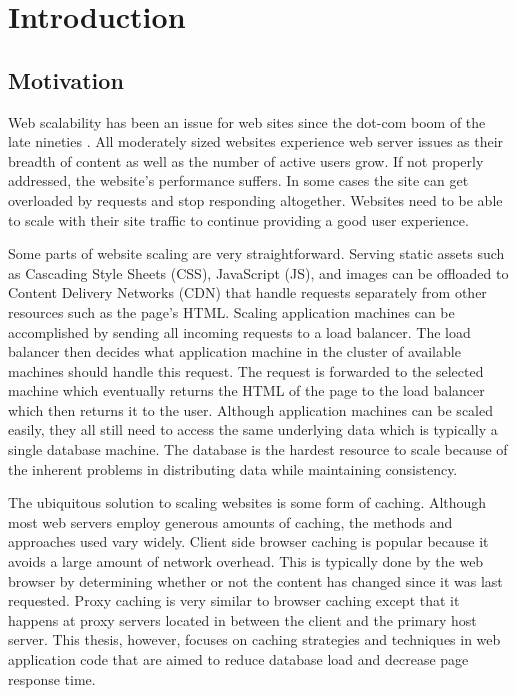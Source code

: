 \documentclass[12pt]{ucthesis}
\begin{document}
\chapter{Introduction}
\label{introduction}

\section{Motivation}
Web scalability has been an issue for web sites since the dot-com boom of the late nineties \cite{webServerScaling}.
All moderately sized websites experience web server issues as their breadth of content as well as the number of active users grow.
If not properly addressed, the website's performance suffers.
In some cases the site can get overloaded by requests and stop responding altogether.
Websites need to be able to scale with their site traffic to continue providing a good user experience.

Some parts of website scaling are very straightforward.
Serving static assets such as Cascading Style Sheets (CSS), JavaScript (JS), and images can be offloaded to Content Delivery Networks (CDN) that handle requests separately from other resources such as the page's HTML.
Scaling application machines can be accomplished by sending all incoming requests to a load balancer.
The load balancer then decides what application machine in the cluster of available machines should handle this request.
The request is forwarded to the selected machine which eventually returns the HTML of the page to the load balancer which then returns it to the user.
Although application machines can be scaled easily, they all still need to access the same underlying data which is typically a single database machine.
The database is the hardest resource to scale because of the inherent problems in distributing data while maintaining consistency.

The ubiquitous solution to scaling websites is some form of caching.
Although most web servers employ generous amounts of caching, the methods and approaches used vary widely.
Client side browser caching is popular because it avoids a large amount of network overhead.
This is typically done by the web browser by determining whether or not the content has changed since it was last requested.
Proxy caching is very similar to browser caching except that it happens at proxy servers located in between the client and the primary host server.
This thesis, however, focuses on caching strategies and techniques in web application code that are aimed to reduce database load and decrease page response time.
\end{document}
